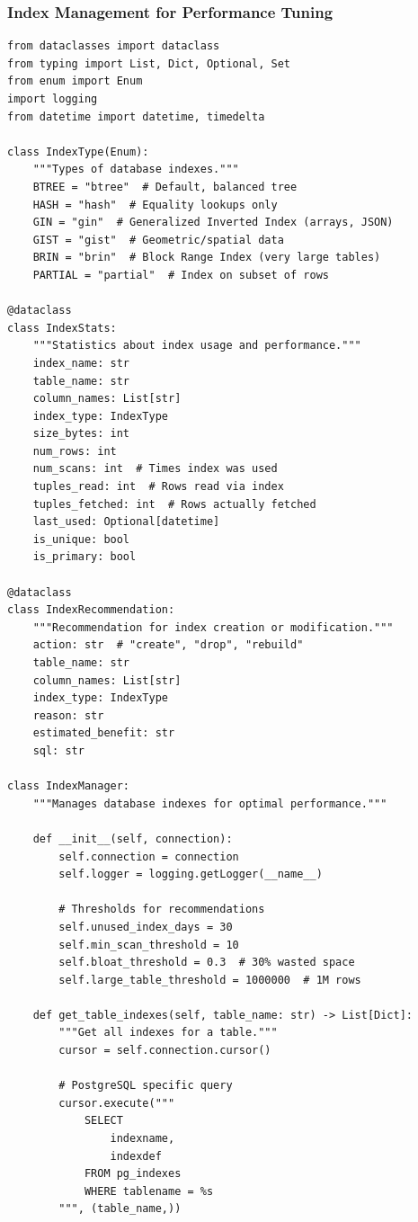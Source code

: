 \subsubsection{Index Management for Performance Tuning}

\begin{lstlisting}[style=python, caption=IndexManager with Smart Recommendations]
from dataclasses import dataclass
from typing import List, Dict, Optional, Set
from enum import Enum
import logging
from datetime import datetime, timedelta

class IndexType(Enum):
    """Types of database indexes."""
    BTREE = "btree"  # Default, balanced tree
    HASH = "hash"  # Equality lookups only
    GIN = "gin"  # Generalized Inverted Index (arrays, JSON)
    GIST = "gist"  # Geometric/spatial data
    BRIN = "brin"  # Block Range Index (very large tables)
    PARTIAL = "partial"  # Index on subset of rows

@dataclass
class IndexStats:
    """Statistics about index usage and performance."""
    index_name: str
    table_name: str
    column_names: List[str]
    index_type: IndexType
    size_bytes: int
    num_rows: int
    num_scans: int  # Times index was used
    tuples_read: int  # Rows read via index
    tuples_fetched: int  # Rows actually fetched
    last_used: Optional[datetime]
    is_unique: bool
    is_primary: bool

@dataclass
class IndexRecommendation:
    """Recommendation for index creation or modification."""
    action: str  # "create", "drop", "rebuild"
    table_name: str
    column_names: List[str]
    index_type: IndexType
    reason: str
    estimated_benefit: str
    sql: str

class IndexManager:
    """Manages database indexes for optimal performance."""

    def __init__(self, connection):
        self.connection = connection
        self.logger = logging.getLogger(__name__)

        # Thresholds for recommendations
        self.unused_index_days = 30
        self.min_scan_threshold = 10
        self.bloat_threshold = 0.3  # 30% wasted space
        self.large_table_threshold = 1000000  # 1M rows

    def get_table_indexes(self, table_name: str) -> List[Dict]:
        """Get all indexes for a table."""
        cursor = self.connection.cursor()

        # PostgreSQL specific query
        cursor.execute("""
            SELECT
                indexname,
                indexdef
            FROM pg_indexes
            WHERE tablename = %s
        """, (table_name,))


\end{lstlisting}
